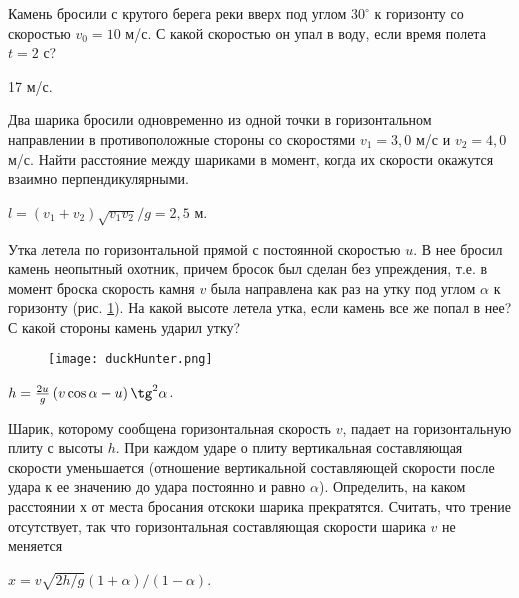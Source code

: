 \begin{ex} %
Камень бросили с крутого берега реки вверх под углом $30^{\circ}$ к горизонту со скоростью $v_0 = 10$ м/с. С какой скоростью он упал в воду, если время полета $t = 2$ с?
\begin{ans}
17 м/с.
\end{ans}
\end{ex}	

\complexProblems

\begin{ex} %
Два шарика бросили одновременно из одной точки в горизонтальном направлении в противоположные стороны со скоростями $v_1 = 3,0$ м/с и $v_2 = 4,0$ м/с. Найти расстояние между шариками в момент, когда их скорости окажутся взаимно перпендикулярными.
\begin{ans}
$l = (v_1 + v_2)\sqrt{v_1 v_2}/g = 2,5$ м.
\end{ans}
\end{ex}	

\begin{ex} %
Утка летела по горизонтальной прямой с постоянной скоростью $u$. В нее бросил камень неопытный охотник, причем бросок был сделан без упреждения, т.е. в момент броска скорость камня $v$ была направлена как раз на утку под углом $\alpha$ к горизонту (рис. \ref{duckHunter}). На какой высоте летела утка, если камень все же попал в нее? С какой стороны камень ударил утку?

\begin{figure}
\centering
\texttt{[image: duckHunter.png]}
\caption{}
\label{duckHunter}
\end{figure}

\begin{ans}
$h = \frac{2u}{g}\left( v \cos \alpha - u \right) \tg^2 \alpha$.
\end{ans}
\end{ex}

\begin{ex} %
Шарик, которому сообщена горизонтальная скорость $v$, падает на горизонтальную плиту с высоты $h$. При каждом ударе о плиту вертикальная составляющая скорости уменьшается (отношение вертикальной составляющей скорости после удара к ее значению до удара
постоянно и равно $\alpha$). Определить, на каком расстоянии $х$ от места бросания отскоки шарика прекратятся. Считать, что трение отсутствует, так что горизонтальная составляющая скорости шарика $v$ не меняется
\begin{ans}
$x = v \sqrt{2h/g} \left( 1 + \alpha \right) / \left( 1 - \alpha \right)$.
\end{ans}
\end{ex}

\clearpage
